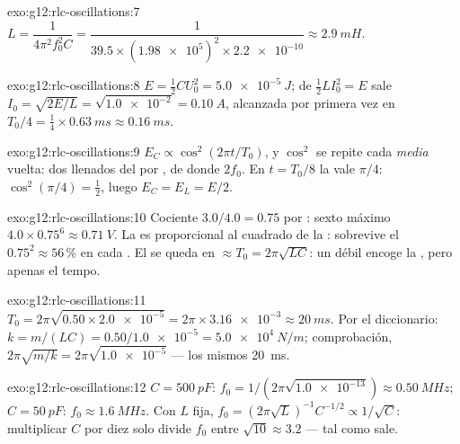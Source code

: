\begin{solution}{exo:g12:rlc-oscillations:7}
$L = \dfrac{1}{4\pi^2 f_0^2 C} = \dfrac{1}{39.5 \times
(\num{1.98e5})^2 \times \num{2.2e-10}} \approx \qty{2.9}{mH}$.
\end{solution}

\begin{solution}{exo:g12:rlc-oscillations:8}
$E = \tfrac12 CU_0^2 = \qty{5.0e-5}{J}$; de $\tfrac12 LI_0^2 = E$ sale
$I_0 = \sqrt{2E/L} = \sqrt{\num{1.0e-2}} = \qty{0.10}{A}$, alcanzada por
primera vez en $T_0/4 = \tfrac14 \times \qty{0.63}{ms} \approx
\qty{0.16}{ms}$.
\end{solution}

\begin{solution}{exo:g12:rlc-oscillations:9}
$E_C \propto \cos^2(2\pi t/T_0)$, y $\cos^2$ se repite cada
\emph{media} vuelta: dos llenados del  por , de donde
$2f_0$. En $t = T_0/8$ la  vale $\pi/4$: $\cos^2(\pi/4) = \tfrac12$,
luego $E_C = E_L = E/2$.
\end{solution}

\begin{solution}{exo:g12:rlc-oscillations:10}
Cociente $3.0/4.0 = 0.75$ por : sexto máximo
$4.0 \times 0.75^6 \approx \qty{0.71}{V}$. La  es proporcional al
cuadrado de la : sobrevive el $0.75^2 \approx 56\,\%$ en cada
. El  se queda en $\approx T_0 = 2\pi\sqrt{LC}$: un
 débil encoge la , pero apenas el tempo.
\end{solution}

\begin{solution}{exo:g12:rlc-oscillations:11}
$T_0 = 2\pi\sqrt{0.50 \times \num{2.0e-5}} = 2\pi \times \num{3.16e-3}
\approx \qty{20}{ms}$. Por el diccionario:
$k = m/(LC) = 0.50/\num{1.0e-5} = \qty{5.0e4}{N/m}$; comprobación,
$2\pi\sqrt{m/k} = 2\pi\sqrt{\num{1.0e-5}}$ --- los mismos \qty{20}{ms}.
\end{solution}

\begin{solution}{exo:g12:rlc-oscillations:12}
$C = \qty{500}{pF}$: $f_0 = 1/(2\pi\sqrt{\num{1.0e-13}}) \approx
\qty{0.50}{MHz}$; $C = \qty{50}{pF}$: $f_0 \approx \qty{1.6}{MHz}$. Con
$L$ fija, $f_0 = (2\pi\sqrt{L})^{-1} C^{-1/2} \propto 1/\sqrt{C}$:
multiplicar $C$ por diez solo divide $f_0$ entre
$\sqrt{10} \approx 3.2$ --- tal como sale.
\end{solution}

